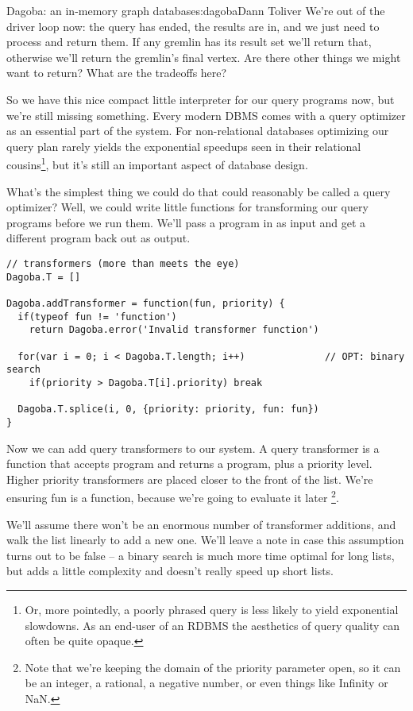 \begin{aosachapter}{Dagoba: an in-memory graph database}{s:dagoba}{Dann Toliver}
We're out of the driver loop now: the query has ended, the results are
in, and we just need to process and return them. If any gremlin has its
result set we'll return that, otherwise we'll return the gremlin's final
vertex. Are there other things we might want to return? What are the
tradeoffs here?

\label{query-transformers}

So we have this nice compact little interpreter for our query programs
now, but we're still missing something. Every modern DBMS comes with a
query optimizer as an essential part of the system. For non-relational
databases optimizing our query plan rarely yields the exponential
speedups seen in their relational cousins\footnote{Or, more pointedly, a
  poorly phrased query is less likely to yield exponential slowdowns. As
  an end-user of an RDBMS the aesthetics of query quality can often be
  quite opaque.}, but it's still an important aspect of database design.

What's the simplest thing we could do that could reasonably be called a
query optimizer? Well, we could write little functions for transforming
our query programs before we run them. We'll pass a program in as input
and get a different program back out as output.

\begin{verbatim}
// transformers (more than meets the eye)
Dagoba.T = []                                           

Dagoba.addTransformer = function(fun, priority) {
  if(typeof fun != 'function')
    return Dagoba.error('Invalid transformer function') 
  
  for(var i = 0; i < Dagoba.T.length; i++)              // OPT: binary search
    if(priority > Dagoba.T[i].priority) break
  
  Dagoba.T.splice(i, 0, {priority: priority, fun: fun})
}
\end{verbatim}

Now we can add query transformers to our system. A query transformer is
a function that accepts program and returns a program, plus a priority
level. Higher priority transformers are placed closer to the front of
the list. We're ensuring fun is a function, because we're going to
evaluate it later \footnote{Note that we're keeping the domain of the
  priority parameter open, so it can be an integer, a rational, a
  negative number, or even things like Infinity or NaN.}.

We'll assume there won't be an enormous number of transformer additions,
and walk the list linearly to add a new one. We'll leave a note in case
this assumption turns out to be false -- a binary search is much more
time optimal for long lists, but adds a little complexity and doesn't
really speed up short lists.


\end{aosachapter}
